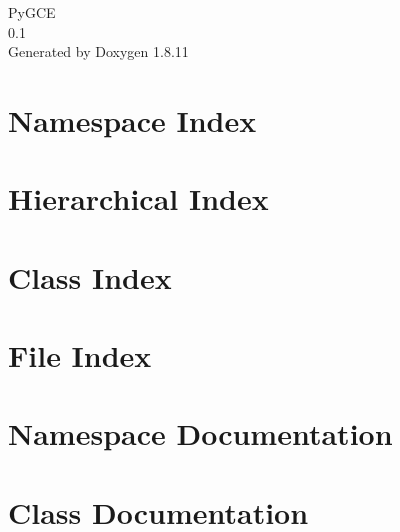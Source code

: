 \documentclass[twoside]{book}
\newcommand{\+}{\discretionary{\mbox{\scriptsize$\hookleftarrow$}}{}{}}
\newcommand{\clearemptydoublepage}{%
  \newpage{\pagestyle{empty}\cleardoublepage}%
}
\begin{document}
\hypersetup{pageanchor=false,
             bookmarksnumbered=true,
             pdfencoding=unicode
            }
\begin{titlepage}
\vspace*{7cm}
\begin{center}%
{\Large Py\+G\+CE \\[1ex]\large 0.\+1 }\\
\vspace*{1cm}
{\large Generated by Doxygen 1.8.11}\\
\end{center}
\end{titlepage}
\clearemptydoublepage
\tableofcontents
\clearemptydoublepage
{}
\hypersetup{pageanchor=true}

\chapter{Namespace Index}

\chapter{Hierarchical Index}

\chapter{Class Index}

\chapter{File Index}

\chapter{Namespace Documentation}











\chapter{Class Documentation}













\end{document}
